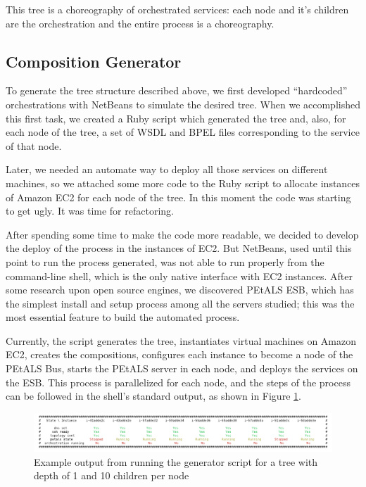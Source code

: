 This tree is a choreography of orchestrated services: each node and it's children are the orchestration and the entire process is a choreography.

\subsection{Composition Generator}
To generate the tree structure described above, we first developed ``hardcoded'' orchestrations with NetBeans to simulate the desired tree. When we accomplished this first task, we created a Ruby script which generated the tree and, also, for each node of the tree, a set of WSDL and BPEL files corresponding to the service of that node.

Later, we needed an automate way to deploy all those services on different machines, so we attached some more code to the Ruby script to allocate instances of Amazon EC2 for each node of the tree. In this moment the code was starting to get ugly. It was time for refactoring.

After spending some time to make the code more readable, we decided to develop the deploy of the process in the instances of EC2. But NetBeans, used until this point to run the process generated, was not able to run properly from the command-line shell, which is the only native interface with EC2 instances. After some research upon open source engines, we discovered PEtALS ESB, which has the simplest install and setup process among all the servers studied; this was the most essential feature to build the automated process.

Currently, the script generates the tree, instantiates virtual machines on Amazon EC2, creates the compositions, configures each instance to become a node of the PEtALS Bus, starts the PEtALS server in each node, and deploys the services on the ESB. This process is parallelized for each node, and the steps of the process can be followed in the shell's standard output, as shown in Figure \ref{generation-output}.


\begin{figure}[htb]
	\centering
	\includegraphics[trim= 10mm 0mm 10mm 0mm, clip, width=\textwidth]{images/generation-output}
	\caption{Example output from running the generator script for a tree with depth of 1 and 10 children per node}
	\label{generation-output}
\end{figure}

